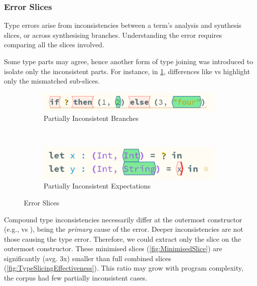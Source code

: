 \subsubsection{Error Slices}
\label{sec:ErrorSlices}
Type errors arise from inconsistencies between a term’s analysis and synthesis slices, or across synthesising branches. Understanding the error requires comparing all the slices involved.

Some type parts may agree, hence another form of type joining was introduced to isolate only the inconsistent parts. For instance, in \cref{fig:ErrorSlice}, differences like  vs  highlight only the mismatched sub-slices.

\begin{figure}[h]
\begin{subfigure}{0.45\textwidth}
\centering

\includegraphics[width=1\textwidth]{Media/Figures/partially_inconsistent_branches}
\caption{Partially Inconsistent Branches}
\end{subfigure}$\qquad$
\begin{subfigure}{0.45\textwidth}
\centering

\includegraphics[width=1\textwidth]{Media/Figures/partially_inconsistent_expectations}
\caption{Partially Inconsistent Expectations}
\end{subfigure}

\caption{Error Slices}
\label{fig:ErrorSlice}
\end{figure}

Compound type inconsistencies necessarily differ at the outermost constructor (e.g.,  vs ), being the \textit{primary} cause of the error. Deeper inconsistencies are not those causing the type error. Therefore, we could extract only the slice on the outermost constructor. These minimised slices (\cref{fig:MinimisedSlice}) are significantly (avg. 3x) smaller than full combined slices (\cref{fig:TypeSlicingEffectiveness}). This ratio may grow with program complexity, the corpus had few partially inconsistent cases.

